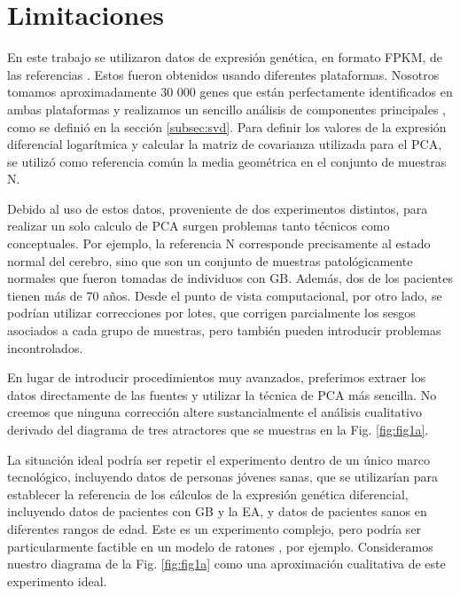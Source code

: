 \section{Limitaciones}

En este trabajo se utilizaron datos de expresión genética, en formato FPKM, de las referencias \cite{Brennan_2013, Miller_2017}. Estos fueron obtenidos usando diferentes plataformas. Nosotros tomamos aproximadamente 30 000 genes que están perfectamente identificados en ambas plataformas y realizamos un sencillo análisis de componentes principales \cite{Lever2017}, como se definió en la sección \ref{subsec:svd}. Para definir los valores de la expresión diferencial logarítmica y calcular la matriz de covarianza utilizada para el PCA, se utilizó como referencia común la media geométrica en el conjunto de muestras N.

Debido al uso de estos datos, proveniente de dos experimentos distintos, para realizar un solo calculo de PCA surgen problemas tanto técnicos como conceptuales. Por ejemplo, la referencia N corresponde precisamente al estado normal del cerebro, sino que son un conjunto de muestras patológicamente normales que fueron tomadas de individuos con GB. Además, dos de los pacientes tienen más de 70 años. Desde el punto de vista computacional, por otro lado, se podrían utilizar correcciones por lotes\cite{haghverdi2018batch, zhang2020combat}, que corrigen parcialmente los sesgos asociados a cada grupo de muestras, pero también pueden introducir problemas incontrolados.

En lugar de introducir procedimientos muy avanzados, preferimos extraer los datos directamente de las fuentes y utilizar la técnica de PCA más sencilla. No creemos que ninguna corrección altere sustancialmente el análisis cualitativo derivado del diagrama de tres atractores que se muestras en la Fig. \ref{fig:fig1a}.

La situación ideal podría ser repetir el experimento dentro de un único marco tecnológico, incluyendo datos de personas jóvenes sanas, que se utilizarían para establecer la referencia de los cálculos de la expresión genética diferencial, incluyendo datos de pacientes con GB y la EA, y datos de pacientes sanos en diferentes rangos de edad. Este es un experimento complejo, pero podría ser particularmente factible en un modelo de ratones \cite{hahn2023atlas}, por ejemplo. Consideramos nuestro diagrama de la Fig. \ref{fig:fig1a} como una aproximación cualitativa de este experimento ideal.